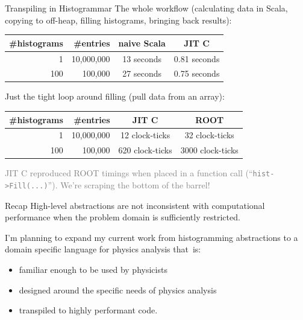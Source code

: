 \documentclass{beamer}
\begin{document}
\begin{frame}{Transpiling in Histogrammar}
\renewcommand{\arraystretch}{1.2}
\vfill
\vfill
The whole workflow (calculating data in Scala, copying to off-heap, filling histograms, bringing back results):

\begin{center}
\begin{tabular}{r r c c}
\#histograms & \#entries & naive Scala & JIT C \\\hline
1 & 10,000,000 & 13 seconds & 0.81 seconds \\
100 & 100,000 & 27 seconds & 0.75 seconds \\
\end{tabular}
\end{center}

\vfill
Just the tight loop around filling (pull data from an array):

\begin{center}
\begin{tabular}{r r c c}
\#histograms & \#entries & JIT C & ROOT \\\hline
1 & 10,000,000 & 12 clock-ticks & 32 clock-ticks \\
100 & 100,000 & 620 clock-ticks & 3000 clock-ticks \\
\end{tabular}
\end{center}

\textcolor{gray}{JIT C reproduced ROOT timings when placed in a function call (``{\tt \small hist->Fill(...)}''). We're scraping the bottom of the barrel!}
\end{frame}

\begin{frame}{Recap}
High-level abstractions are not inconsistent with computational performance when the problem domain is sufficiently restricted.

\vfill
I'm planning to expand my current work from histogramming abstractions to a domain specific language for physics analysis \mbox{that is:}
\begin{itemize}
\item familiar enough to be used by physicists
\item designed around the specific needs of physics analysis
\item transpiled to highly performant code.
\end{itemize}
\end{frame}
\end{document}

